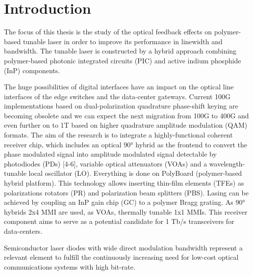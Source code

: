 \chapter{Introduction}
\label{ch:Introduction}
The focus of this thesis is the study of the optical feedback effects on polymer-based tunable laser in order to improve its performance in linewidth and bandwidth. The tunable laser is constructed by a hybrid approach combining polymer-based photonic integrated circuits (PIC) and active indium phosphide (InP) components.

The huge possibilities of digital interfaces have an impact on the optical line interfaces of the edge switches and the data-center gateways. Current 100G implementations based on dual-polarization quadrature phase-shift keying are becoming obsolete and we can expect the next migration from 100G to 400G and even further on to 1T based on higher quadrature amplitude modulation (QAM) formats. The aim of the research is to integrate a highly-functional coherent receiver chip, which includes an optical 90° hybrid as the frontend to convert the phase modulated signal into amplitude modulated signal detectable by photodiodes (PDs) [4-6], variable optical attenuators (VOAs) and a wavelength-tunable local oscillator (LO). Everything is done on PolyBoard (polymer-based hybrid platform). This technology allows inserting thin-film elements (TFEs) as polarizations rotators (PR) and polarization beam splitters (PBS). Lasing can be achieved by coupling an InP gain chip (GC) to a polymer Bragg grating. As 90° hybrids 2x4 MMI are used, as VOAs, thermally tunable 1x1 MMIs. This receiver component aims to serve as a potential candidate for 1 Tb/s transceivers for data-centers.

Semiconductor laser diodes with wide direct modulation bandwidth represent a relevant element to fulfill the continuously increasing need for low-cost optical communications systems with high bit-rate.



